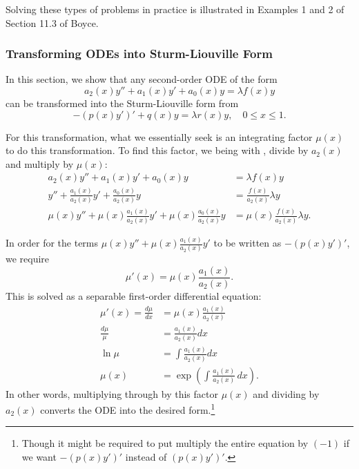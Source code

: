 Solving these types of problems in practice is illustrated in Examples 1 and 2 of Section 11.3 of Boyce.

\subsubsection{Transforming ODEs into Sturm-Liouville Form}

In this section, we show that any second-order ODE of the form
\begin{equation}\label{eq:sltransform}
	a_2(x)y'' + a_1(x)y' + a_0(x)y = \lambda f(x)y
\end{equation}
can be transformed into the Sturm-Liouville form from 
\begin{equation}\label{eq:sltransform2}
	-\left(p(x)y'\right)' + q(x)y = \lambda r(x)y, \quad 0 \leq x \leq 1.
\end{equation}

For this transformation, what we essentially seek is an integrating factor $\mu(x)$ to do this transformation. To find this factor, we being with , divide by $a_2(x)$ and multiply by $\mu(x)$:
\begin{align*}
	a_2(x)y'' + a_1(x)y' + a_0(x)y &= \lambda f(x)y \\
	y'' + \frac{a_1(x)}{a_2(x)}y' + \frac{a_0(x)}{a_2(x)}y &= \frac{f(x)}{a_2(x)}\lambda y \\
	\mu(x)y'' + \mu(x)\frac{a_1(x)}{a_2(x)}y' + \mu(x)\frac{a_0(x)}{a_2(x)}y &= \mu(x)\frac{f(x)}{a_2(x)}\lambda y.
\end{align*}

In order for the terms $\mu(x)y'' + \mu(x)\frac{a_1(x)}{a_2(x)}y'$ to be written as $-(p(x)y')'$, we require
\[
\mu'(x) = \mu(x)\frac{a_1(x)}{a_2(x)}.
\]
This is solved as a separable first-order differential equation:
\begin{align*}
	\mu'(x) = \frac{d\mu}{dx} &= \mu(x)\frac{a_1(x)}{a_2(x)} \\
	\frac{d\mu}{\mu} &= \frac{a_1(x)}{a_2(x)} dx \\ \ln\mu &= \int \frac{a_1(x)}{a_2(x)} dx \\
	\mu(x) &= \exp\left(\int \frac{a_1(x)}{a_2(x)} \,dx\right).
\end{align*}
In other words, multiplying through by this factor $\mu(x)$ and dividing by $a_2(x)$ converts the ODE into the desired form.\footnote{Though it might be required to put multiply the entire equation by $(-1)$ if we want $-(p(x)y')'$ instead of $(p(x)y')'$.}

